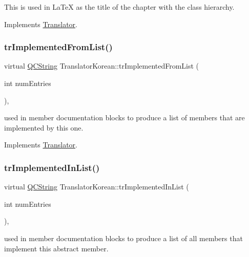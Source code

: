 This is used in La\+TeX as the title of the chapter with the class hierarchy. 

Implements \mbox{\hyperlink{class_translator}{Translator}}.

\mbox{\label{class_translator_korean_a15af8276ab99323b2c70e06b39c2fa7a}} 
\subsubsection{\texorpdfstring{trImplementedFromList()}{trImplementedFromList()}}
{\footnotesize\ttfamily virtual \mbox{\hyperlink{class_q_c_string}{Q\+C\+String}} Translator\+Korean\+::tr\+Implemented\+From\+List (\begin{DoxyParamCaption}\item[{int}]{num\+Entries }\end{DoxyParamCaption})\hspace{0.3cm}{\ttfamily [inline]}, {\ttfamily [virtual]}}

used in member documentation blocks to produce a list of members that are implemented by this one. 

Implements \mbox{\hyperlink{class_translator}{Translator}}.

\mbox{\label{class_translator_korean_a06804d4e2253eea63c74f45109aec2ee}} 
\subsubsection{\texorpdfstring{trImplementedInList()}{trImplementedInList()}}
{\footnotesize\ttfamily virtual \mbox{\hyperlink{class_q_c_string}{Q\+C\+String}} Translator\+Korean\+::tr\+Implemented\+In\+List (\begin{DoxyParamCaption}\item[{int}]{num\+Entries }\end{DoxyParamCaption})\hspace{0.3cm}{\ttfamily [inline]}, {\ttfamily [virtual]}}

used in member documentation blocks to produce a list of all members that implement this abstract member. 

